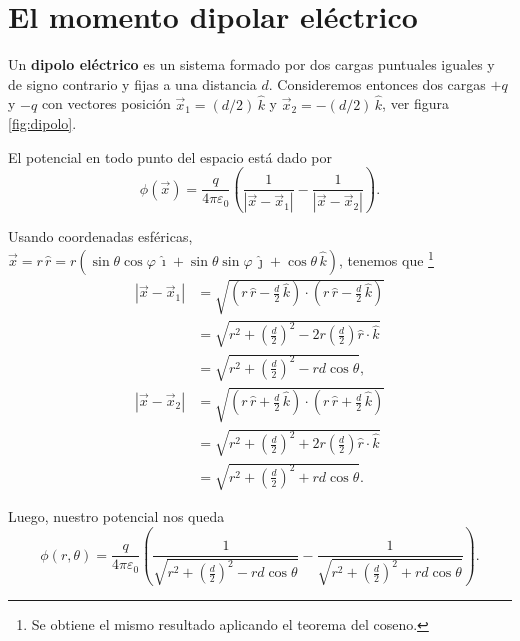 \section{El momento dipolar eléctrico}

Un \textbf{dipolo eléctrico} es un sistema formado por dos cargas puntuales iguales y de signo contrario y fijas a una distancia $d$. Consideremos entonces dos cargas $+q$ y $-q$ con vectores posición $\Vec{x}_1 = (d/2) \,\hat{k}$ y $\Vec{x}_2 = -(d/2)\,\hat{k}$, ver figura \ref{fig:dipolo}.

El potencial en todo punto del espacio está dado por
$$\phi(\Vec{x}) = \frac{q}{4\pi\varepsilon_0} \left( \frac{1}{|\Vec{x} - \Vec{x}_1|} - \frac{1}{|\Vec{x} - \Vec{x}_2|}\right).$$

Usando coordenadas esféricas, $\Vec{x} = r \,\hat{r} = r(\sin \theta \cos\varphi \,\hat{\imath} + \sin \theta \sin \varphi\,\hat{\jmath} + \cos \theta \,\hat{k})$, tenemos que \footnote{Se obtiene el mismo resultado aplicando el teorema del coseno.}
\begingroup
\allowdisplaybreaks
\begin{align*}
    |\Vec{x} - \Vec{x}_1| &= \sqrt{\left(r\,\hat{r} - \frac{d}{2} \,\hat{k} \right) \cdot\left(r\,\hat{r} - \frac{d}{2} \,\hat{k} \right) } \\
    &= \sqrt{r^2 + \left(\frac{d}{2} \right)^2 - 2 r \left( \frac{d}{2} \right) \hat{r} \cdot \hat{k}} \\
    &= \sqrt{r^2 + \left(\frac{d}{2} \right)^2 - rd \cos\theta} ,\\
     |\Vec{x} - \Vec{x}_2| &= \sqrt{\left(r\,\hat{r} + \frac{d}{2} \,\hat{k} \right) \cdot\left(r\,\hat{r} + \frac{d}{2} \,\hat{k} \right) } \\
    &= \sqrt{r^2 + \left(\frac{d}{2} \right)^2 + 2 r \left( \frac{d}{2} \right) \hat{r} \cdot \hat{k}} \\
    &= \sqrt{r^2 + \left(\frac{d}{2} \right)^2 + rd \cos\theta} .
\end{align*}
\endgroup


Luego, nuestro potencial nos queda
\begin{equation}
  \phi(r,\theta) = \frac{q}{4\pi\varepsilon_0} \left(\frac{1}{\sqrt{r^2 + \left(\frac{d}{2} \right)^2 - rd \cos\theta}} - \frac{1}{\sqrt{r^2 + \left(\frac{d}{2} \right)^2 + rd \cos\theta}} \right). \label{PotencialDipolo}  
\end{equation}

